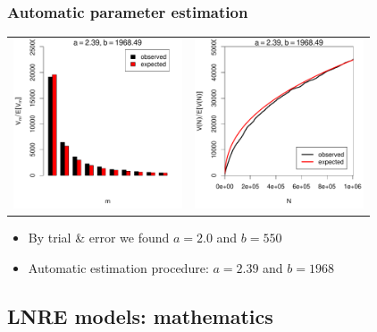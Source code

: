 \documentclass[t]{beamer} %
\begin{document}
\begin{frame}
  \frametitle{Automatic parameter estimation}

  \begin{center}
    \begin{tabular}{c @{} c}
      \includegraphics[width=50mm]{img/05-estimation-spc-estimated} &
      \includegraphics[width=50mm]{img/05-estimation-vgc-estimated} 
    \end{tabular}
  \end{center}

  \ungap[1]
  \begin{itemize}
    \item By trial \& error we found $a=2.0$ and $b=550$
    \item Automatic estimation procedure: $a=2.39$ and $b=1968$
  \end{itemize}
\end{frame}


\subsection{LNRE models: mathematics}
\end{document}
